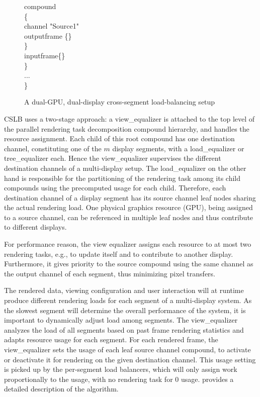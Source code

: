 \begin{figure}[h!t]
{\begin{minipage}[b]{0.46\textwidth}
{\quad \quad compound \\
\quad \quad \{  \\
\quad \quad \quad channel "Source1"  \\
\quad \quad \quad outputframe \{\}  \\
\quad \quad \} \\
\quad \quad inputframe\{\} \\
\quad \} \\
\quad ... \\
\} \\
	\label{fViewEqualizerConfig}}
	\end{minipage}
   }
\caption{A dual-GPU, dual-display cross-segment load-balancing setup}
\label{fViewEqualizer}
\end{figure}

CSLB uses a two-stage approach: a {\sf view\_equalizer} is attached to the top
level of the parallel rendering task decomposition compound hierarchy, and
handles the resource assignment. Each child of this root compound has one
destination channel, constituting one of the $m$ display segments, with a {\sf
load\_equalizer} or \textsf{tree\_equalizer} each. Hence the {\sf
view\_equalizer} supervises the different destination channels of a
multi-display setup. The {\sf load\_equalizer} on the other hand is responsible
for the partitioning of the rendering task among its child compounds using the
precomputed usage for each child. Therefore, each destination channel of a
display segment has its source channel leaf nodes sharing the actual rendering
load. One physical graphics resource (GPU), being assigned to a source channel,
can be referenced in multiple leaf nodes and thus contribute to different
displays.

For performance reason, the view equalizer assigns each resource to at most two
rendering tasks, e.g., to update itself and to contribute to another display.
Furthermore, it gives priority to the source compound using the same channel as
the output channel of each segment, thus minimizing pixel transfers.

The rendered data, viewing configuration and user interaction will at runtime
produce different rendering loads for each segment of a multi-display system. As
the slowest segment will determine the overall performance of the system, it is
important to dynamically adjust load among segments. The {\sf view\_equalizer}
analyzes the load of all segments based on past frame rendering statistics and
adapts resource usage for each segment. For each rendered frame, the {\sf
view\_equalizer} sets the usage of each leaf source channel compound, to
activate or deactivate it for rendering on the given destination channel. This
usage setting is picked up by the per-segment load balancers, which will only
assign work proportionally to the usage, with no rendering task for $0$ usage.
\cite{EEP:11} provides a detailed description of the algorithm.

